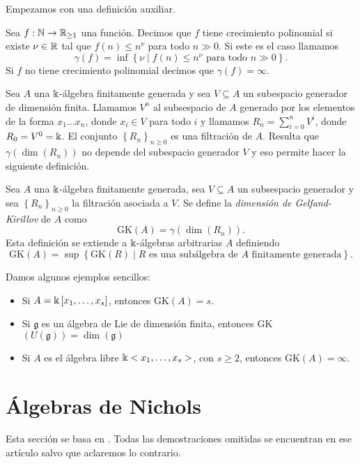 \documentclass[a4paper,oneside,fleqn,11pt,../tesis.tex]{subfiles}
\begin{document}
Empezamos con una definición auxiliar.
\begin{definition}
	Sea $f:\mathbb{N} \to \mathbb{R}_{\geq 1}$ una función. Decimos que $f$ tiene crecimiento polinomial si existe $\nu \in \mathbb{R}$
	tal que $f(n) \leq n^{\nu}$ para todo $n \gg 0$. Si este es el caso llamamos
	\[		
		\gamma(f) = \inf \left\lbrace \nu \mid f(n) \leq n^{\nu} \text{ para todo } n \gg 0  \right\rbrace.
	\]
	Si $f$ no tiene crecimiento polinomial decimos que $\gamma(f) = \infty$.
\end{definition}

Sea $A$ una $\Bbbk$-álgebra finitamente generada y sea $V \subseteq A$ un subespacio generador de dimensión finita.
Llamamos $V^n$ al subsespacio de $A$ generado por los elementos de la forma $x_{1} \ldots x_n$, donde $x_i \in V$ para todo $i$
y llamamos $R_n = \sum_{i = 0}^n V^i$, donde $R_0 = V^0 = \Bbbk$. El conjunto $\left\lbrace R_n \right\rbrace_{n \geq 0}$ es una
filtración de $A$. Resulta que $\gamma(\dim(R_n))$ no depende del subespacio generador $V$ y eso permite hacer la siguiente definición.

\begin{definition}
	Sea $A$ una $\Bbbk$-álgebra finitamente generada, sea $V \subseteq A$ un subsespacio generador y sea $\left\lbrace R_n \right\rbrace_{n \geq 0}$
	la filtración asociada a $V$. Se define la \emph{dimensión de Gelfand-Kirillov} de $A$ como
	\[
		\text{GK}(A) = \gamma(\dim(R_n)).	
	\]
	Esta definición se extiende a $\Bbbk$-álgebras arbitrarias $A$ definiendo
	\[
		\text{GK}(A) = \sup\left\lbrace \text{GK}(R) \mid R \text{ es una subálgebra de }A\text{ finitamente generada} \right\rbrace.
	\]
\end{definition}

\begin{example}	Damos algunos ejemplos sencillos:
	\begin{itemize}		
		\item Si $A = \Bbbk\left[x_1, \ldots, x_s\right]$, entonces GK$(A) = s$.
		\item Si $\mathfrak{g}$ es un álgebra de Lie de dimensión finita, entonces GK$(U(\mathfrak{g})) = \dim(\mathfrak{g})$
		\item Si $A$ es el álgebra libre $\Bbbk <x_1, \ldots, x_s>$, con $s \geq 2$, entonces GK$(A) = \infty$.
	\end{itemize}
\end{example}


\section{Álgebras de Nichols}
Esta sección se basa en \cite{AS2}. Todas las demostraciones omitidas se encuentran en ese artículo
salvo que aclaremos lo contrario.
\end{document}
